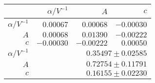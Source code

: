 \begin{table}
\caption{}
\centering
 \begin{tabular}{|r|r|r|r|}
 \hline 
\cellcolor{tabcolor}&\cellcolor{tabcolor}$\alpha/ V^{-1}$&\cellcolor{tabcolor}$A$&\cellcolor{tabcolor}$c$\\ \hline 
 \cellcolor{tabcolor}$\alpha/ V^{-1}$&$0.00067$ &$0.00068$ &$-0.00030$ \\ 
\cellcolor{tabcolor}$A$&$0.00068$ &$0.01390$ &$-0.00222$ \\ 
\cellcolor{tabcolor}$c$&$-0.00030$ &$-0.00222$ &$0.00050$ \\ \hline \hline
\cellcolor{tabcolor}$\alpha/ V^{-1}$&\multicolumn{3}{r|}{$0.35497 \pm 0.02585$ }\\ 
\cellcolor{tabcolor}$A$&\multicolumn{3}{r|}{$0.72754 \pm 0.11791$ }\\ 
\cellcolor{tabcolor}$c$&\multicolumn{3}{r|}{$0.16155 \pm 0.02230$ }\\ 
\hline\end{tabular}
\end{table}
